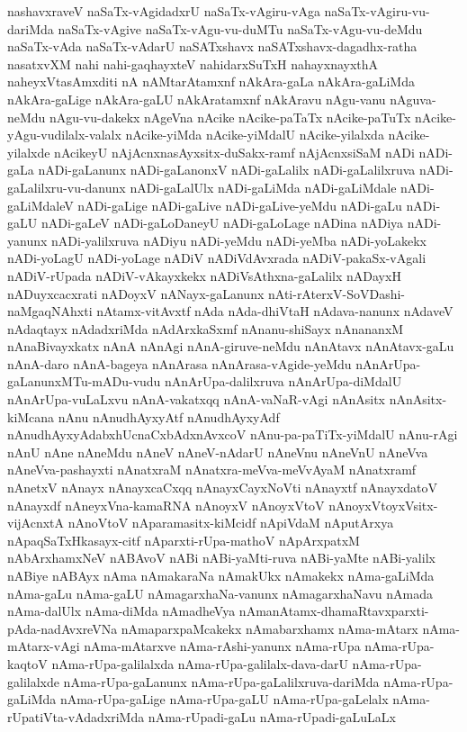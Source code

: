 {nashavxraveV
naSaTx-vAgidadxrU
naSaTx-vAgiru-vAga
naSaTx-vAgiru-vu-dariMda
naSaTx-vAgive
naSaTx-vAgu-vu-duMTu
naSaTx-vAgu-vu-deMdu
naSaTx-vAda
naSaTx-vAdarU
naSATxshavx
naSATxshavx-dagadhx-ratha
nasatxvXM
nahi
nahi-gaqhayxteV
nahidarxSuTxH
nahayxnayxthA
naheyxVtasAmxditi
nA
nAMtarAtamxnf
nAkAra-gaLa
nAkAra-gaLiMda
nAkAra-gaLige
nAkAra-gaLU
nAkAratamxnf
nAkAravu
nAgu-vanu
nAguva-neMdu
nAgu-vu-dakekx
nAgeVna
nAcike
nAcike-paTaTx
nAcike-paTuTx
nAcike-yAgu-vudilalx-valalx
nAcike-yiMda
nAcike-yiMdalU
nAcike-yilalxda
nAcike-yilalxde
nAcikeyU
nAjAcnxnasAyxsitx-duSakx-ramf
nAjAcnxsiSaM
nADi
nADi-gaLa
nADi-gaLanunx
nADi-gaLanonxV
nADi-gaLalilx
nADi-gaLalilxruva
nADi-gaLalilxru-vu-danunx
nADi-gaLalUlx
nADi-gaLiMda
nADi-gaLiMdale
nADi-gaLiMdaleV
nADi-gaLige
nADi-gaLive
nADi-gaLive-yeMdu
nADi-gaLu
nADi-gaLU
nADi-gaLeV
nADi-gaLoDaneyU
nADi-gaLoLage
nADina
nADiya
nADi-yanunx
nADi-yalilxruva
nADiyu
nADi-yeMdu
nADi-yeMba
nADi-yoLakekx
nADi-yoLagU
nADi-yoLage
nADiV
nADiVdAvxrada
nADiV-pakaSx-vAgali
nADiV-rUpada
nADiV-vAkayxkekx
nADiVsAthxna-gaLalilx
nADayxH
nADuyxcacxrati
nADoyxV
nANayx-gaLanunx
nAti-rAterxV-SoVDashi-naMgaqNAhxti
nAtamx-vitAvxtf
nAda
nAda-dhiVtaH
nAdava-nanunx
nAdaveV
nAdaqtayx
nAdadxriMda
nAdArxkaSxmf
nAnanu-shiSayx
nAnananxM
nAnaBivayxkatx
nAnA
nAnAgi
nAnA-giruve-neMdu
nAnAtavx
nAnAtavx-gaLu
nAnA-daro
nAnA-bageya
nAnArasa
nAnArasa-vAgide-yeMdu
nAnArUpa-gaLanunxMTu-mADu-vudu
nAnArUpa-dalilxruva
nAnArUpa-diMdalU
nAnArUpa-vuLaLxvu
nAnA-vakatxqq
nAnA-vaNaR-vAgi
nAnAsitx
nAnAsitx-kiMcana
nAnu
nAnudhAyxyAtf
nAnudhAyxyAdf
nAnudhAyxyAdabxhUcnaCxbAdxnAvxcoV
nAnu-pa-paTiTx-yiMdalU
nAnu-rAgi
nAnU
nAne
nAneMdu
nAneV
nAneV-nAdarU
nAneVnu
nAneVnU
nAneVva
nAneVva-pashayxti
nAnatxraM
nAnatxra-meVva-meVvAyaM
nAnatxramf
nAnetxV
nAnayx
nAnayxcaCxqq
nAnayxCayxNoVti
nAnayxtf
nAnayxdatoV
nAnayxdf
nAneyxVna-kamaRNA
nAnoyxV
nAnoyxVtoV
nAnoyxVtoyxVsitx-vijAcnxtA
nAnoVtoV
nAparamasitx-kiMcidf
nApiVdaM
nAputArxya
nApaqSaTxHkasayx-citf
nAparxti-rUpa-mathoV
nApArxpatxM
nAbArxhamxNeV
nABAvoV
nABi
nABi-yaMti-ruva
nABi-yaMte
nABi-yalilx
nABiye
nABAyx
nAma
nAmakaraNa
nAmakUkx
nAmakekx
nAma-gaLiMda
nAma-gaLu
nAma-gaLU
nAmagarxhaNa-vanunx
nAmagarxhaNavu
nAmada
nAma-dalUlx
nAma-diMda
nAmadheVya
nAmanAtamx-dhamaRtavxparxti-pAda-nadAvxreVNa
nAmaparxpaMcakekx
nAmabarxhamx
nAma-mAtarx
nAma-mAtarx-vAgi
nAma-mAtarxve
nAma-rAshi-yanunx
nAma-rUpa
nAma-rUpa-kaqtoV
nAma-rUpa-galilalxda
nAma-rUpa-galilalx-dava-darU
nAma-rUpa-galilalxde
nAma-rUpa-gaLanunx
nAma-rUpa-gaLalilxruva-dariMda
nAma-rUpa-gaLiMda
nAma-rUpa-gaLige
nAma-rUpa-gaLU
nAma-rUpa-gaLelalx
nAma-rUpatiVta-vAdadxriMda
nAma-rUpadi-gaLu
nAma-rUpadi-gaLuLaLx
}
